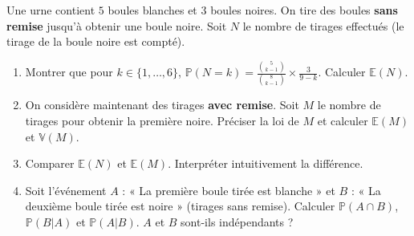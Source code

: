 \documentclass[11pt]{article}
\begin{document}
\begin{exercice}
Une urne contient $5$ boules blanches et $3$ boules noires. On tire des boules \textbf{sans remise} jusqu'à obtenir une boule noire. Soit $N$ le nombre de tirages effectués (le tirage de la boule noire est compté).
\begin{enumerate}
    \item Montrer que pour $k \in \{1, \dots, 6\}$, $\mathbb{P}(N=k) = \frac{\binom{5}{k-1}}{\binom{8}{k-1}} \times \frac{3}{9-k}$. Calculer $\mathbb{E}(N)$.
    \item On considère maintenant des tirages \textbf{avec remise}. Soit $M$ le nombre de tirages pour obtenir la première noire. Préciser la loi de $M$ et calculer $\mathbb{E}(M)$ et $\mathbb{V}(M)$.
    \item Comparer $\mathbb{E}(N)$ et $\mathbb{E}(M)$. Interpréter intuitivement la différence.
    \item Soit l'événement $A$ : « La première boule tirée est blanche » et $B$ : « La deuxième boule tirée est noire » (tirages sans remise). Calculer $\mathbb{P}(A \cap B)$, $\mathbb{P}(B|A)$ et $\mathbb{P}(A|B)$. $A$ et $B$ sont-ils indépendants ?
\end{enumerate}
\end{exercice}
\end{document}
